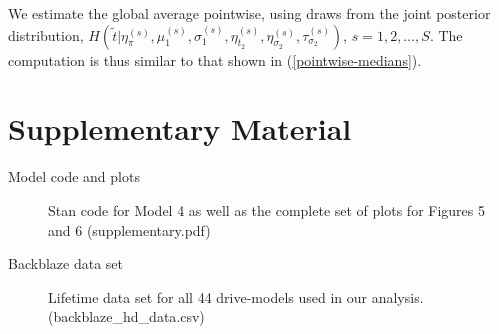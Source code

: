 \documentclass[12pt]{article}
\newcommand{\op}{\operatorname}
\begin{document}
We estimate the global average pointwise, using draws from the joint posterior distribution, $H\left(\tilde{t}|\eta_\pi^{(s)}, \mu_1^{(s)}, \sigma_1^{(s)}, \eta_{t_2}^{(s)},\eta_{\sigma_2}^{(s)},\tau_{\sigma_2}^{(s)}\right)$, $s=1,2,\ldots,S$. The computation is thus similar to that shown in (\ref{pointwise-medians}).


\section{Supplementary Material}
\label{sec:supple}

\begin{description}

\item[Model code and plots] Stan code for Model 4 as well as the complete set of plots for Figures 5 and 6 (supplementary.pdf)

\item[Backblaze data set] Lifetime data set for all 44 drive-models used in our analysis. (backblaze\_hd\_data.csv)

\end{description}

%




\end{document}
